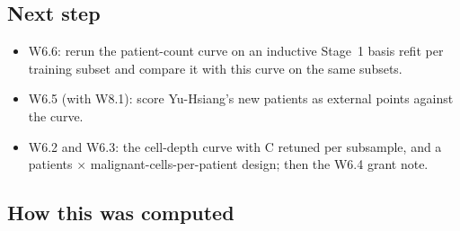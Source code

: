 \subsection*{Next step}
\begin{itemize}
\item W6.6: rerun the patient-count curve on an inductive Stage~1 basis refit per training subset and compare it with this curve on the same subsets.
\item W6.5 (with W8.1): score Yu-Hsiang's new patients as external points against the curve.
\item W6.2 and W6.3: the cell-depth curve with C retuned per subsample, and a patients $\times$ malignant-cells-per-patient design; then the W6.4 grant note.
\end{itemize}

\subsection*{How this was computed}
